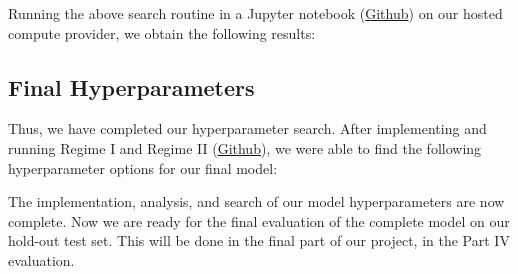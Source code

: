 

\noindent
Running the above search routine in a Jupyter notebook (\href{https://github.com/ShenZhouHong/radiography-ai-project/blob/13893a1c14cbfdd78876fda2a45aa765377d7cfc/python/hyperparam-search/regime-2.ipynb}{Github}) on our hosted compute provider, we obtain the following results:





\subsection{Final Hyperparameters}

Thus, we have completed our hyperparameter search. After implementing and running Regime I and Regime II (\href{https://github.com/ShenZhouHong/radiography-ai-project/tree/13893a1c14cbfdd78876fda2a45aa765377d7cfc/python/hyperparam-search}{Github}), we were able to find the following hyperparameter options for our final model:



\noindent
The implementation, analysis, and search of our model hyperparameters are now complete. Now we are ready for the final evaluation of the complete model on our hold-out test set. This will be done in the final part of our project, in the Part IV evaluation.